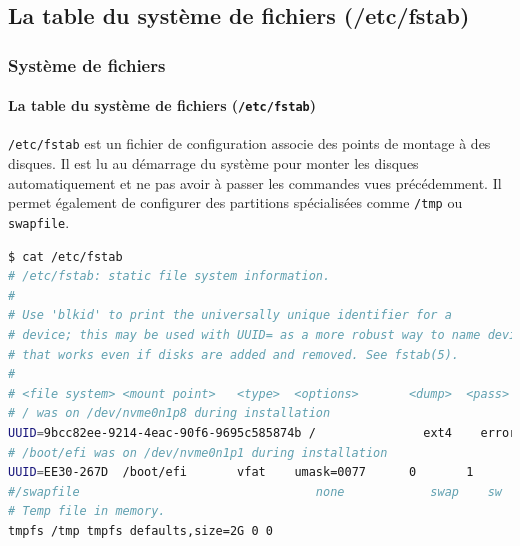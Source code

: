 \documentclass{beamer}
\begin{document}
    \subsection{La table du système de fichiers (/etc/fstab)}\label{subsec:fstab}
    \begin{frame}[fragile]
        \transdissolve
        \frametitle{Système de fichiers}
        \framesubtitle{La table du système de fichiers (\lstinline{/etc/fstab})}
        \lstinline{/etc/fstab} est un fichier de configuration associe des points de montage à des disques.
        Il est lu au démarrage du système pour monter les disques automatiquement et ne pas avoir à passer les commandes vues précédemment.
        \bigbreak
        Il permet également de configurer des partitions spécialisées comme \lstinline{/tmp} ou \lstinline{swapfile}.
        \begin{lstlisting}[language=bash,basicstyle=\tiny\ttfamily]
$ cat /etc/fstab
# /etc/fstab: static file system information.
#
# Use 'blkid' to print the universally unique identifier for a
# device; this may be used with UUID= as a more robust way to name devices
# that works even if disks are added and removed. See fstab(5).
#
# <file system> <mount point>   <type>  <options>       <dump>  <pass>
# / was on /dev/nvme0n1p8 during installation
UUID=9bcc82ee-9214-4eac-90f6-9695c585874b /               ext4    errors=remount-ro 0       1
# /boot/efi was on /dev/nvme0n1p1 during installation
UUID=EE30-267D  /boot/efi       vfat    umask=0077      0       1
#/swapfile                                 none            swap    sw              0       0
# Temp file in memory.
tmpfs /tmp tmpfs defaults,size=2G 0 0
        \end{lstlisting}
    \end{frame}
\end{document}
